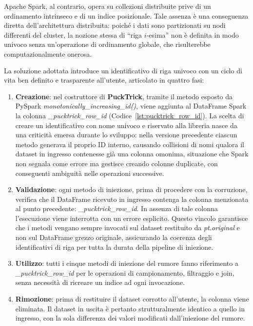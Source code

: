 \documentclass[../main.tex]{subfiles}
\begin{document}
Apache Spark, al contrario, opera su collezioni distribuite prive di un ordinamento intrinseco e di un indice posizionale. Tale assenza è una conseguenza diretta dell'architettura distribuita: poiché i dati sono partizionati su nodi differenti del cluster, la nozione stessa di ``riga $i$-esima'' non è definita in modo univoco senza un'operazione di ordinamento globale, che risulterebbe computazionalmente onerosa.

La soluzione adottata introduce un identificativo di riga univoco con un ciclo di vita ben definito e trasparente all'utente, articolato in quattro fasi:

\begin{enumerate}
    \item \textbf{Creazione}: nel costruttore di \textbf{PuckTrick}, tramite il metodo esposto da PySpark \textit{monotonically\_increasing\_id()}, viene aggiunta al DataFrame Spark la colonna \textit{\_pucktrick\_row\_id} (Codice~\ref{lst:pucktrick_row_id}). La scelta di creare un identificativo con nome univoco e riservato alla libreria nasce da una criticità emersa durante lo sviluppo: nella versione precedente ciascun metodo generava il proprio ID interno, causando collisioni di nomi qualora il dataset in ingresso contenesse già una colonna omonima, situazione che Spark non segnala come errore ma gestisce creando colonne duplicate, con conseguenti ambiguità nelle operazioni successive.

    \item \textbf{Validazione}: ogni metodo di iniezione, prima di procedere con la corruzione, verifica che il DataFrame ricevuto in ingresso contenga la colonna menzionata al punto precedente: \textit{\_pucktrick\_row\_id}. In assenza di tale colonna l'esecuzione viene interrotta con un errore esplicito. Questo vincolo garantisce che i metodi vengano sempre invocati sul dataset restituito da \textit{pt.original} e non sul DataFrame grezzo originale, assicurando la coerenza degli identificativi di riga per tutta la durata della pipeline di iniezione.

    \item \textbf{Utilizzo}: tutti i cinque metodi di iniezione del rumore fanno riferimento a \textit{\_pucktrick\_row\_id} per le operazioni di campionamento, filtraggio e join, senza necessità di ricreare un indice ad ogni invocazione.

    \item \textbf{Rimozione}: prima di restituire il dataset corrotto all'utente, la colonna viene eliminata. Il dataset in uscita è pertanto strutturalmente identico a quello in ingresso, con la sola differenza dei valori modificati dall'iniezione del rumore.
\end{enumerate}
\end{document}

